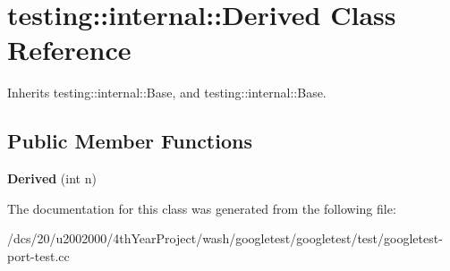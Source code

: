 \hypertarget{classtesting_1_1internal_1_1Derived}{}\section{testing\+:\+:internal\+:\+:Derived Class Reference}
\label{classtesting_1_1internal_1_1Derived}


Inherits testing\+::internal\+::\+Base, and testing\+::internal\+::\+Base.

\subsection*{Public Member Functions}
\begin{DoxyCompactItemize}
\item 
\mbox{\label{classtesting_1_1internal_1_1Derived_a05a8e8354c7c09a9f3728a96c96f1edd}} 
{\bfseries Derived} (int n)
\end{DoxyCompactItemize}


The documentation for this class was generated from the following file\+:\begin{DoxyCompactItemize}
\item 
/dcs/20/u2002000/4th\+Year\+Project/wash/googletest/googletest/test/googletest-\/port-\/test.\+cc\end{DoxyCompactItemize}
